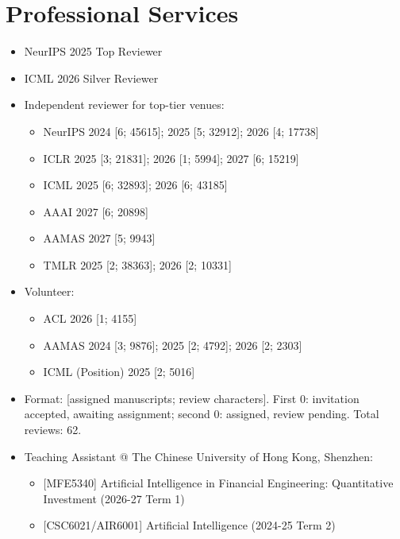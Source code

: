 \documentclass[a4paper,20pt]{article}
\begin{document}
\vspace{5pt}
\section{Professional Services}
\vspace{3pt}

\begin{itemize}[leftmargin=*, itemsep=0pt, topsep=0pt, partopsep=0pt]
    \item NeurIPS 2025 Top Reviewer
    \item ICML 2026 Silver Reviewer
    \item Independent reviewer for top-tier venues:
    \begin{itemize}
        \item NeurIPS 2024 [6; 45615]; 2025 [5; 32912]; 2026 [4; 17738]
        \item ICLR 2025 [3; 21831]; 2026 [1; 5994]; 2027 [6; 15219]
        \item ICML 2025 [6; 32893]; 2026 [6; 43185]
        \item AAAI 2027 [6; 20898]
        \item AAMAS 2027 [5; 9943]
        \item TMLR 2025 [2; 38363]; 2026 [2; 10331]
    \end{itemize}
    \item Volunteer:
    \begin{itemize}
        \item ACL 2026 [1; 4155]
        \item AAMAS 2024 [3; 9876]; 2025 [2; 4792]; 2026 [2; 2303]
        \item ICML (Position) 2025 [2; 5016]
    \end{itemize}
    \item Format: [assigned manuscripts; review characters]. First 0: invitation accepted, awaiting assignment; second 0: assigned, review pending. Total reviews: 62.
    \item Teaching Assistant @ The Chinese University of Hong Kong, Shenzhen:
    \begin{itemize}
        \item {[MFE5340]} Artificial Intelligence in Financial Engineering: Quantitative Investment (2026-27 Term 1)
        \item {[CSC6021/AIR6001]} Artificial Intelligence (2024-25 Term 2)
    \end{itemize}
\end{itemize}
\end{document}

